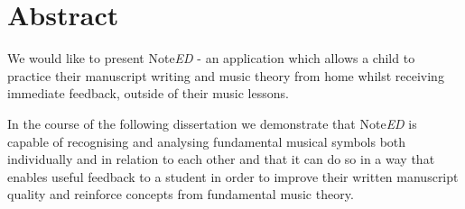 \chapter*{Abstract}
We would like to present Note\emph{ED} - an application which allows a child to practice their manuscript writing and music theory from home whilst receiving immediate feedback, outside of their music lessons.

In the course of the following dissertation we demonstrate that Note\emph{ED} is capable of recognising and analysing fundamental musical symbols both individually and in relation to each other and that it can do so in a way that enables useful feedback to a student in order to improve their written manuscript quality and reinforce concepts from fundamental music theory.

